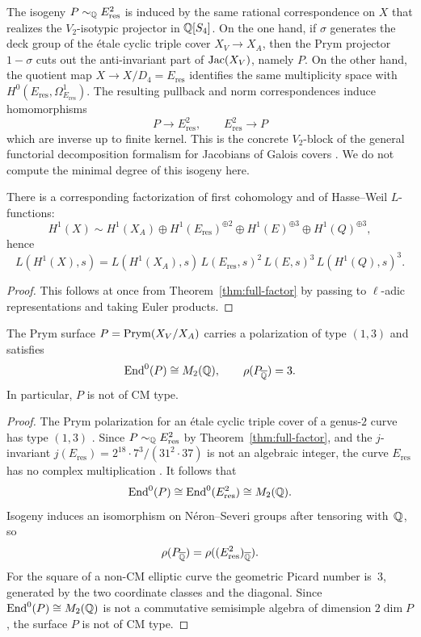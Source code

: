 \begin{remark}\label{rem:prym-correspondence}
The isogeny \(P\sim_{\mathbb{Q}}E_{\mathrm{res}}^2\) is induced by the same rational correspondence on \(X\) that realizes the \(V_2\)-isotypic projector in \(\mathbb{Q}[S_4]\). On the one hand, if \(\sigma\) generates the deck group of the \'etale cyclic triple cover \(X_V\to X_A\), then the Prym projector \(1-\sigma\) cuts out the anti-invariant part of \(\operatorname{Jac}(X_V)\), namely \(P\). On the other hand, the quotient map \(X\to X/D_4=E_{\mathrm{res}}\) identifies the same multiplicity space with \(H^0(E_{\mathrm{res}},\Omega_{E_{\mathrm{res}}}^1)\). The resulting pullback and norm correspondences induce homomorphisms
\[
P\longrightarrow E_{\mathrm{res}}^2,
\qquad
E_{\mathrm{res}}^2\longrightarrow P
\]
which are inverse up to finite kernel. This is the concrete \(V_2\)-block of the general functorial decomposition formalism for Jacobians of Galois covers \cite{LombardoEtAl2023}. We do not compute the minimal degree of this isogeny here.
\end{remark}

\begin{corollary}\label{cor:l-factor}
There is a corresponding factorization of first cohomology and of Hasse--Weil \(L\)-functions:
\[
H^1(X)\sim H^1(X_A)\oplus H^1(E_{\mathrm{res}})^{\oplus 2}\oplus H^1(E)^{\oplus 3}\oplus H^1(Q)^{\oplus 3},
\]
hence
\[
L(H^1(X),s)=L(H^1(X_A),s)\,L(E_{\mathrm{res}},s)^2\,L(E,s)^3\,L(H^1(Q),s)^3.
\]
\end{corollary}

\begin{proof}
This follows at once from Theorem~\ref{thm:full-factor} by passing to \(\ell\)-adic representations and taking Euler products.
\end{proof}

\begin{proposition}\label{prop:prym-end}
The Prym surface \(P=\operatorname{Prym}(X_V/X_A)\) carries a polarization of type \((1,3)\) and satisfies
\[
\operatorname{End}^0(P)\cong M_2(\mathbb{Q}),
\qquad
\rho(P_{\overline{\mathbb{Q}}})=3.
\]
In particular, \(P\) is not of CM type.
\end{proposition}

\begin{proof}
The Prym polarization for an \'etale cyclic triple cover of a genus-\(2\) curve has type \((1,3)\) \cite[Section~12.9]{BirkenhakeLange2004}. Since \(P\sim_{\mathbb{Q}}E_{\mathrm{res}}^2\) by Theorem~\ref{thm:full-factor}, and the \(j\)-invariant \(j(E_{\mathrm{res}})=2^{18}\cdot 7^3/(31^2\cdot 37)\) is not an algebraic integer, the curve \(E_{\mathrm{res}}\) has no complex multiplication \cite[Ch.~II]{Silverman2009}. It follows that
\[
\operatorname{End}^0(P)\cong \operatorname{End}^0(E_{\mathrm{res}}^2)\cong M_2(\mathbb{Q}).
\]
Isogeny induces an isomorphism on N\'eron--Severi groups after tensoring with~\(\mathbb{Q}\), so
\[
\rho(P_{\overline{\mathbb{Q}}})=\rho((E_{\mathrm{res}}^2)_{\overline{\mathbb{Q}}}).
\]
For the square of a non-CM elliptic curve the geometric Picard number is~\(3\), generated by the two coordinate classes and the diagonal. Since \(\operatorname{End}^0(P)\cong M_2(\mathbb{Q})\) is not a commutative semisimple algebra of dimension \(2\dim P\), the surface \(P\) is not of CM type.
\end{proof}


